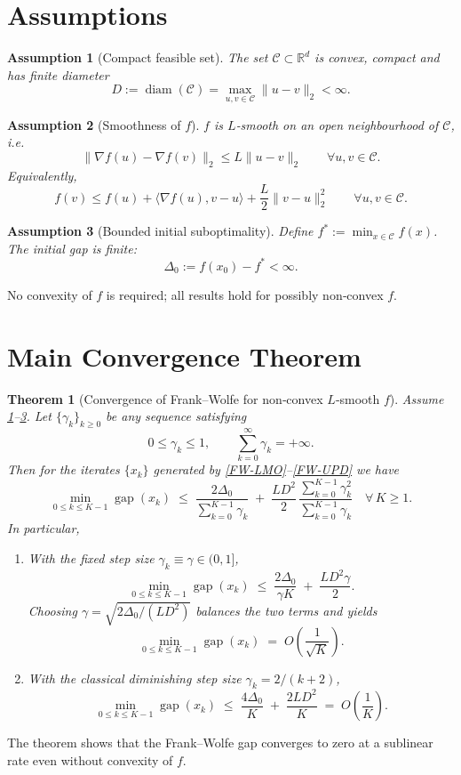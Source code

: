 \documentclass{article}
\newtheorem{theorem}{Theorem}
\newtheorem{assumption}{Assumption}
\newcommand{\diam}{\operatorname{diam}}
\newcommand{\gap}{\operatorname{gap}}
\begin{document}
\section{Assumptions}
\label{sec:assumptions}
\begin{assumption}[Compact feasible set]
\label{ass:C}
The set $\mathcal C\subset\mathbb{R}^{d}$ is convex, compact and has finite diameter
\[
D:=\diam(\mathcal C)=\max_{u,v\in\mathcal C}\|u-v\|_{2}<\infty .
\]
\end{assumption}
\begin{assumption}[Smoothness of $f$]
\label{ass:smooth}
$f$ is $L$‑smooth on an open neighbourhood of $\mathcal C$, i.e.
\[
\|\nabla f(u)-\nabla f(v)\|_{2}\le L\|u-v\|_{2}\qquad\forall u,v\in\mathcal C .
\]
Equivalently,
\[
f(v)\le f(u)+\langle\nabla f(u),v-u\rangle+\frac{L}{2}\|v-u\|_{2}^{2}\qquad\forall u,v\in\mathcal C .
\tag{Smoothness\,Ineq.}
\]
\end{assumption}
\begin{assumption}[Bounded initial suboptimality]
\label{ass:bound}
Define $f^{*}:=\min_{x\in\mathcal C}f(x)$. The initial gap is finite:
\[
\Delta_{0}:=f(x_{0})-f^{*}<\infty .
\]
\end{assumption}

No convexity of $f$ is required; all results hold for possibly non‑convex $f$.

\section{Main Convergence Theorem}
\label{sec:theorem}
\begin{theorem}[Convergence of Frank–Wolfe for non‑convex $L$‑smooth $f$]
\label{thm:main}
Assume \ref{ass:C}–\ref{ass:bound}.  Let $\{\gamma_{k}\}_{k\ge0}$ be any sequence satisfying
\[
0\le\gamma_{k}\le 1,\qquad\sum_{k=0}^{\infty}\gamma_{k}=+\infty .
\]
Then for the iterates $\{x_{k}\}$ generated by \eqref{FW‑LMO}–\eqref{FW‑UPD} we have
\[
\min_{0\le k\le K-1}\gap(x_{k})
\;\le\;
\frac{2\Delta_{0}}{\sum_{k=0}^{K-1}\gamma_{k}}
\;+\;
\frac{L D^{2}}{2}\,\frac{\sum_{k=0}^{K-1}\gamma_{k}^{2}}{\sum_{k=0}^{K-1}\gamma_{k}}
\quad\forall\,K\ge1.
\tag{1}
\]
In particular,
\begin{enumerate}[label=(\alph*)]
\item With the fixed step size $\gamma_{k}\equiv\gamma\in(0,1]$,
\[
\min_{0\le k\le K-1}\gap(x_{k})
\;\le\;
\frac{2\Delta_{0}}{\gamma K}
\;+\;
\frac{L D^{2}\gamma}{2}.
\tag{2}
\]
Choosing $\gamma=\sqrt{2\Delta_{0}/(L D^{2})}$ balances the two terms and yields
\[
\min_{0\le k\le K-1}\gap(x_{k})
\;=\;O\!\left(\frac{1}{\sqrt{K}}\right).
\]

\item With the classical diminishing step size $\gamma_{k}=2/(k+2)$,
\[
\min_{0\le k\le K-1}\gap(x_{k})
\;\le\;
\frac{4\Delta_{0}}{K}
\;+\;
\frac{2L D^{2}}{K}
\;=\;O\!\left(\frac{1}{K}\right).
\tag{3}
\]
\end{enumerate}
\end{theorem}
The theorem shows that the Frank–Wolfe gap converges to zero at a sublinear rate even without convexity of $f$.
\end{document}
